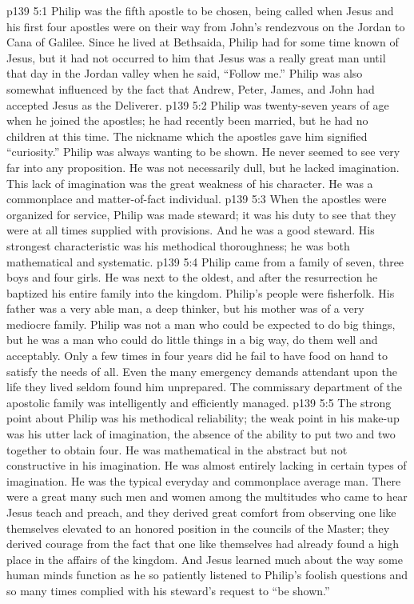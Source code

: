 \vs p139 5:1 Philip was the fifth apostle to be chosen, being called when Jesus and his first four apostles were on their way from John’s rendezvous on the Jordan to Cana of Galilee. Since he lived at Bethsaida, Philip had for some time known of Jesus, but it had not occurred to him that Jesus was a really great man until that day in the Jordan valley when he said, \textcolor{ubdarkred}{“Follow me.”} Philip was also somewhat influenced by the fact that Andrew, Peter, James, and John had accepted Jesus as the Deliverer.
\vs p139 5:2 Philip was twenty\hyp{}seven years of age when he joined the apostles; he had recently been married, but he had no children at this time. The nickname which the apostles gave him signified “curiosity.” Philip was always wanting to be shown. He never seemed to see very far into any proposition. He was not necessarily dull, but he lacked imagination. This lack of imagination was the great weakness of his character. He was a commonplace and matter\hyp{}of\hyp{}fact individual.
\pc \vs p139 5:3 When the apostles were organized for service, Philip was made steward; it was his duty to see that they were at all times supplied with provisions. And he was a good steward. His strongest characteristic was his methodical thoroughness; he was both mathematical and systematic.
\vs p139 5:4 Philip came from a family of seven, three boys and four girls. He was next to the oldest, and after the resurrection he baptized his entire family into the kingdom. Philip’s people were fisherfolk. His father was a very able man, a deep thinker, but his mother was of a very mediocre family. Philip was not a man who could be expected to do big things, but he was a man who could do little things in a big way, do them well and acceptably. Only a few times in four years did he fail to have food on hand to satisfy the needs of all. Even the many emergency demands attendant upon the life they lived seldom found him unprepared. The commissary department of the apostolic family was intelligently and efficiently managed.
\vs p139 5:5 The strong point about Philip was his methodical reliability; the weak point in his make\hyp{}up was his utter lack of imagination, the absence of the ability to put two and two together to obtain four. He was mathematical in the abstract but not constructive in his imagination. He was almost entirely lacking in certain types of imagination. He was the typical everyday and commonplace average man. There were a great many such men and women among the multitudes who came to hear Jesus teach and preach, and they derived great comfort from observing one like themselves elevated to an honored position in the councils of the Master; they derived courage from the fact that one like themselves had already found a high place in the affairs of the kingdom. And Jesus learned much about the way some human minds function as he so patiently listened to Philip’s foolish questions and so many times complied with his steward’s request to “be shown.”
